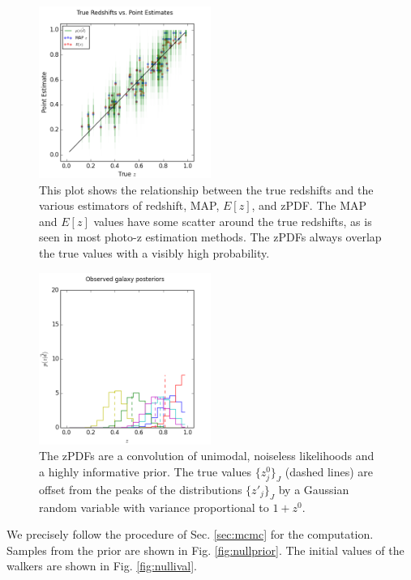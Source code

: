 \documentclass[preprint]{aastex}
\begin{document}
\begin{figure}
\includegraphics[width=0.5\textwidth]{null/truevmap.png}
\caption{This plot shows the relationship between the true redshifts and the various estimators of redshift, MAP, $E[z]$, and zPDF.  The MAP and $E[z]$ values have some scatter around the true redshifts, as is seen in most photo-z estimation methods.  The zPDFs always overlap the true values with a visibly high probability.}
\label{fig:nullcat}
\end{figure}

\begin{figure}
\includegraphics[width=0.5\textwidth]{null/samplepzs.png}
\caption{The zPDFs are a convolution of unimodal, noiseless likelihoods and a highly informative prior.  The true values $\{z^{0}_{j}\}_{J}$ (dashed lines) are offset from the peaks of the distributions $\{z'_{j}\}_{J}$ by a Gaussian random variable with variance proportional to $1+z^{0}$.}
\label{fig:nullpzs}
\end{figure}

We precisely follow the procedure of Sec. \ref{sec:mcmc} for the computation.  Samples from the prior are shown in Fig. \ref{fig:nullprior}.  The initial values of the walkers are shown in Fig. \ref{fig:nullival}.
\end{document}
